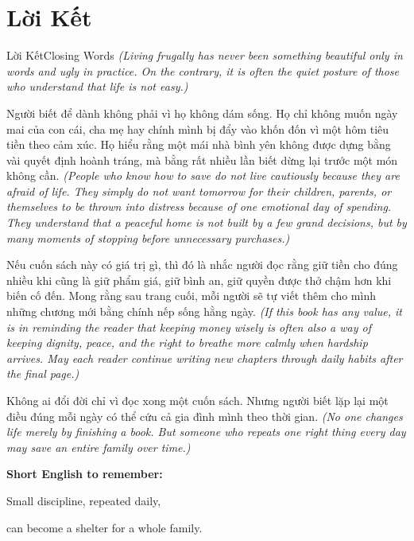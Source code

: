 \chapter*{Lời Kết}

\begin{truyen}{Lời Kết}{Closing Words}
\textit{(Living frugally has never been something beautiful only in words and ugly in practice. On the contrary, it is often the quiet posture of those who understand that life is not easy.)}

Người biết để dành không phải vì họ không dám sống. Họ chỉ không muốn ngày mai của con cái, cha mẹ hay chính mình bị đẩy vào khốn đốn vì một hôm tiêu tiền theo cảm xúc. Họ hiểu rằng một mái nhà bình yên không được dựng bằng vài quyết định hoành tráng, mà bằng rất nhiều lần biết dừng lại trước một món không cần.
\textit{(People who know how to save do not live cautiously because they are afraid of life. They simply do not want tomorrow for their children, parents, or themselves to be thrown into distress because of one emotional day of spending. They understand that a peaceful home is not built by a few grand decisions, but by many moments of stopping before unnecessary purchases.)}

Nếu cuốn sách này có giá trị gì, thì đó là nhắc người đọc rằng giữ tiền cho đúng nhiều khi cũng là giữ phẩm giá, giữ bình an, giữ quyền được thở chậm hơn khi biến cố đến. Mong rằng sau trang cuối, mỗi người sẽ tự viết thêm cho mình những chương mới bằng chính nếp sống hằng ngày.
\textit{(If this book has any value, it is in reminding the reader that keeping money wisely is often also a way of keeping dignity, peace, and the right to breathe more calmly when hardship arrives. May each reader continue writing new chapters through daily habits after the final page.)}
\end{truyen}

\begin{baihoc}
Không ai đổi đời chỉ vì đọc xong một cuốn sách. Nhưng người biết lặp lại một điều đúng mỗi ngày có thể cứu cả gia đình mình theo thời gian.
\textit{(No one changes life merely by finishing a book. But someone who repeats one right thing every day may save an entire family over time.)}
\end{baihoc}

\begin{ghinhoanh}
\textbf{Short English to remember:}

Small discipline, repeated daily,

can become a shelter for a whole family.
\end{ghinhoanh}

\ngancach